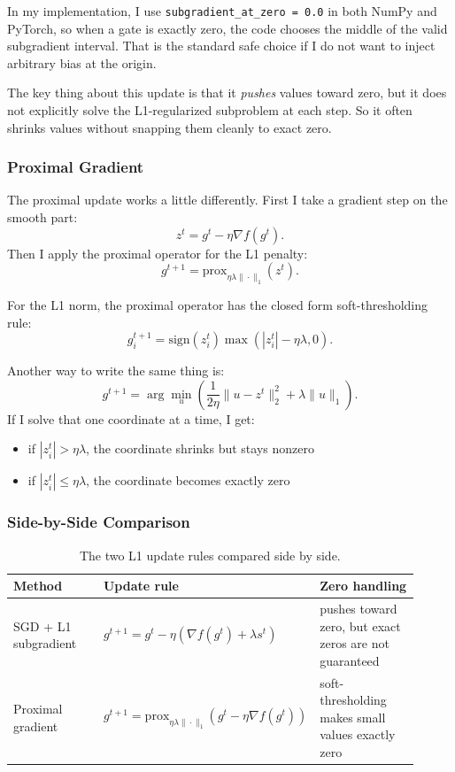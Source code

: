 \documentclass[11pt]{article}
\begin{document}
In my implementation, I use \texttt{subgradient\_at\_zero = 0.0} in both NumPy and PyTorch, so when a gate is exactly zero, the code chooses the middle of the valid subgradient interval. That is the standard safe choice if I do not want to inject arbitrary bias at the origin.

The key thing about this update is that it \emph{pushes} values toward zero, but it does not explicitly solve the L1-regularized subproblem at each step. So it often shrinks values without snapping them cleanly to exact zero.

\subsubsection{Proximal Gradient}
The proximal update works a little differently. First I take a gradient step on the smooth part:
\[
  z^t = g^t - \eta \nabla f(g^t).
\]
Then I apply the proximal operator for the L1 penalty:
\[
  g^{t+1} = \mathrm{prox}_{\eta \lambda \|\cdot\|_1}(z^t).
\]

For the L1 norm, the proximal operator has the closed form soft-thresholding rule:
\[
  g_i^{t+1} = \mathrm{sign}(z_i^t)\max\left(|z_i^t|-\eta\lambda, 0\right).
\]

Another way to write the same thing is:
\[
  g^{t+1} = \arg\min_u \left(\frac{1}{2\eta}\|u-z^t\|_2^2 + \lambda \|u\|_1\right).
\]
If I solve that one coordinate at a time, I get:
\begin{itemize}[leftmargin=*]
  \item if $|z_i^t| > \eta\lambda$, the coordinate shrinks but stays nonzero
  \item if $|z_i^t| \leq \eta\lambda$, the coordinate becomes exactly zero
\end{itemize}

\subsubsection{Side-by-Side Comparison}
\begin{table}[h]
\centering
\begin{tabular}{p{0.27\linewidth}p{0.33\linewidth}p{0.31\linewidth}}
\toprule
Method & Update rule & Zero handling \\
\midrule
SGD + L1 subgradient & $g^{t+1}=g^t-\eta(\nabla f(g^t)+\lambda s^t)$ & pushes toward zero, but exact zeros are not guaranteed \\
Proximal gradient & $g^{t+1}=\mathrm{prox}_{\eta\lambda \|\cdot\|_1}(g^t-\eta\nabla f(g^t))$ & soft-thresholding makes small values exactly zero \\
\bottomrule
\end{tabular}
\caption{The two L1 update rules compared side by side.}
\label{tab:l1-compare}
\end{table}
\end{document}
